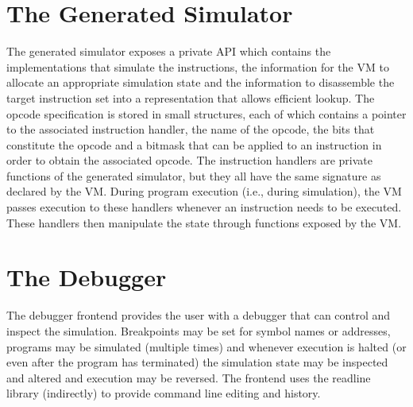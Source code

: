 \section{The Generated Simulator}
The generated simulator exposes a private API which contains the
implementations that simulate the instructions, the information 
for the VM to allocate an appropriate simulation state and the information 
to disassemble the target instruction set into a representation that allows 
efficient lookup. The opcode specification is stored in small 
structures, each of which contains a pointer to the associated instruction 
handler, the name of the opcode, the bits that constitute the opcode and a 
bitmask that can be applied to an instruction in order to obtain the 
associated opcode. The
instruction handlers are private functions of the generated simulator,
but they all have the same signature as declared by the VM. During program
execution (i.e., during simulation), the VM passes execution to these handlers
whenever an instruction needs to be executed. These handlers then manipulate
the state through functions exposed by the VM.

\section{The Debugger}
The debugger frontend provides the user with a debugger that can control and
inspect the simulation. Breakpoints may be set for symbol names or addresses,
programs may be simulated (multiple times) and whenever execution is halted
(or even after the program has terminated) the simulation state may be inspected and
altered and execution may be reversed. The frontend uses the readline library
(indirectly) to provide command line editing and history.


